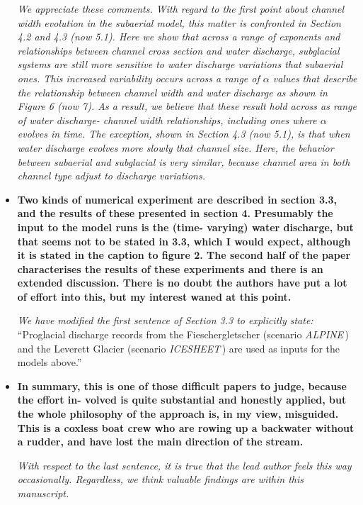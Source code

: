\documentclass[11pt]{article}
\newcommand{\alpine}{\textit{ALPINE}\,}
\newcommand{\icesheet}{\textit{ICESHEET}\,}
\begin{document}
\begin{itemize}
  \textit{We appreciate these comments. With regard to the first point about channel width evolution in the subaerial model, this matter is confronted in Section 4.2 and 4.3 (now 5.1).
    Here we show that across a range of exponents and relationships between channel cross section and water discharge, subglacial systems are still more sensitive to water discharge variations that subaerial ones.
    This increased variability occurs across a range of $\alpha$ values that describe the relationship between channel width and water discharge as shown in Figure 6 (now 7).
    As a result, we believe that these result hold across as range of water discharge- channel width relationships, including ones where $\alpha$ evolves in time.
    The exception, shown in Section 4.3 (now 5.1), is that when water discharge evolves more slowly that channel size. Here, the behavior between subaerial and subglacial is very similar, because channel area in both channel type adjust to discharge variations.}
  

\item   \textbf{Two kinds of numerical experiment are described in section 3.3, and the results of these presented in section 4. Presumably the input to the model runs is the (time- varying) water discharge, but that seems not to be stated in 3.3, which I would expect, although it is stated in the caption to figure 2.
    The second half of the paper characterises the results of these experiments and there is an extended discussion. There is no doubt the authors have put a lot of effort into this, but my interest waned at this point.}
 
  \textit{    We have modified the first sentence of Section 3.3 to explicitly state:}
    ``Proglacial discharge records from the Fieschergletscher (scenario \alpine{}) and the Leverett Glacier (scenario \icesheet{}) are used as inputs for the models above.''

\item \textbf{  In summary, this is one of those difficult papers to judge, because the effort in- volved is quite substantial and honestly applied, but the whole philosophy of the approach is, in my view, misguided. This is a coxless boat crew who are rowing up a backwater without a rudder, and have lost the main direction of the stream.}

  \textit{With respect to the last sentence, it is true that the lead author feels this way occasionally. Regardless, we think valuable findings are within this manuscript.}

\end{itemize}
\end{document}
